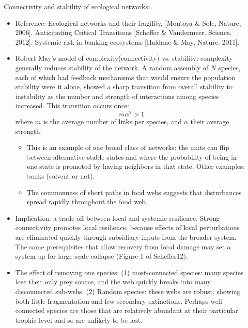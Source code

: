 \documentclass{report}
\begin{document}
\begin{enumerate}
Connectivity and stability of ecological networks: 
\begin{itemize}
\item Reference: Ecological networks and their fragility, [Montoya \& Sole, Nature, 2006]. Anticipating Critical Transitions [Scheffer \& Vandermeer, Science, 2012]. Systemic risk in banking ecosystems [Haldane \& May, Nature, 2011]. 

\item Robert May's model of complexity(connectivity) vs. stability: complexity generally reduces stability of the network. A random assembly of $N$ species, each of which had feedback mechanisms that would ensure the population stability were it alone, showed a sharp transition from overall stability to instability as the number and strength of interactions among species increased. This transition occurs once:
\begin{equation}
m \alpha^2 > 1	
\end{equation}
where $m$ is the average number of links per species, and $\alpha$ their average strength.
\begin{itemize}
\item This is an example of one broad class of networks: the units can flip between alternative stable states and where the probability of being in one state is promoted by having neighbors in that state. Other examples: banks (solvent or not).
\item The commonness of short paths in food webs suggests that disturbances spread rapidly throughout the food web.
\end{itemize}

\item Implication: a trade-off between local and systemic resilience. Strong connectivity promotes local resilience, because effects of local perturbations are eliminated quickly through subsidiary inputs from the broader system. The same prerequisites that allow recovery from local damage may set a system up for large-scale collapse (Figure 1 of Scheffer12). 

\item The effect of removing one species: (1) most-connected species: many species lose their only prey source, and the web quickly breaks into many disconnected sub-webs. (2) Random species: these webs are robust, showing both little fragmentation and few secondary extinctions. Perhaps well-connected species are those that are relatively abundant at their particular trophic level and so are unlikely to be lost.
\end{itemize}


\end{enumerate}
\end{document}
